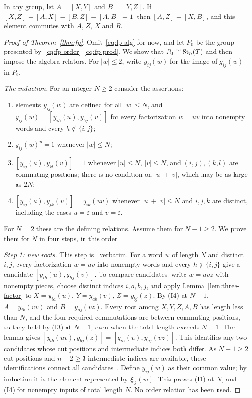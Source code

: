 \begin{lemma}
\label{lem:three-factor}
In any group, let $A=[X,Y]$ and $B=[Y,Z]$. If $[X,Z]=[A,X]=[B,Z]=[A,B]=1$, then $[A,Z]=[X,B]$, and this element
commutes with $A$, $Z$, $X$ and $B$.
\end{lemma}

\begin{proof}[Proof of Theorem~\ref{thm:fp}]
Omit~\eqref{eq:fp-alg} for now, and let $P_0$ be the group presented by~\eqref{eq:fp-order}--\eqref{eq:fp-prod}. We show
that $P_0\cong\operatorname{St}_n(T)$ and then impose the algebra relators. For $|w|\leq2$, write $y_{ij}(w)$ for the image of
$g_{ij}(w)$ in $P_0$.

\emph{The induction.} For an integer $N\geq2$ consider the assertions:
\begin{enumerate}[label=\textup{(I\arabic*)}]
\item elements $y_{ij}(w)$ are defined for all $|w|\leq N$, and $y_{ij}(w)=[y_{ih}(u),y_{hj}(v)]$ for every
factorization $w=uv$ into nonempty words and every $h\notin\{i,j\}$;
\item $y_{ij}(w)^p=1$ whenever $|w|\leq N$;
\item $[y_{ij}(u),y_{kl}(v)]=1$ whenever $|u|\leq N$, $|v|\leq N$, and $(i,j),(k,l)$ are commuting positions; there is
no condition on $|u|+|v|$, which may be as large as $2N$;
\item $[y_{ij}(u),y_{jk}(v)]=y_{ik}(uv)$ whenever $|u|+|v|\leq N$ and $i,j,k$ are distinct, including the cases
$u=\varepsilon$ and $v=\varepsilon$.
\end{enumerate}
For $N=2$ these are the defining relations. Assume them for $N-1\geq2$. We prove them for $N$ in four steps, in this
order.

\emph{Step 1: new roots.} This step is~\cite[proof of Theorem~4.1]{OAI247periodic} verbatim. For a word $w$ of length
$N$ and distinct $i,j$, every factorization $w=uv$ into nonempty words and every $h\notin\{i,j\}$ give a candidate
$[y_{ih}(u),y_{hj}(v)]$. To compare candidates, write $w=uvz$ with nonempty pieces, choose distinct indices $i,a,b,j$,
and apply Lemma~\ref{lem:three-factor} to $X=y_{ia}(u)$, $Y=y_{ab}(v)$, $Z=y_{bj}(z)$. By (I4) at $N-1$,
$A=y_{ib}(uv)$ and $B=y_{aj}(vz)$. Every root among $X,Y,Z,A,B$ has length less than $N$, and the four required
commutations are between commuting positions, so they hold by (I3) at $N-1$, even when the total length exceeds $N-1$.
The lemma gives $[y_{ib}(uv),y_{bj}(z)]=[y_{ia}(u),y_{aj}(vz)]$. This identifies any two candidates whose cut positions
and intermediate indices both differ. As $N-1\geq2$ cut positions and $n-2\geq3$ intermediate indices are available,
these identifications connect all candidates~\cite[proof of Theorem~4.1]{OAI247periodic}. Define $y_{ij}(w)$ as their
common value; by induction it is the element represented by $\xi_{ij}(w)$. This proves (I1) at $N$, and (I4) for
nonempty inputs of total length $N$. No order relation has been used.


\end{proof}
